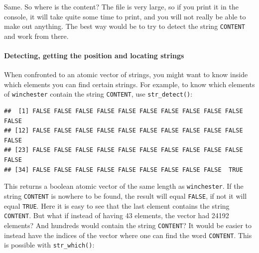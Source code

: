 \documentclass[]{gitbook}
\newenvironment{Shaded}{\begin{snugshade}}{\end{snugshade}}
\newcommand{\KeywordTok}[1]{\textcolor[rgb]{0.13,0.29,0.53}{\textbf{#1}}}
\newcommand{\NormalTok}[1]{#1}
\newcommand{\OperatorTok}[1]{\textcolor[rgb]{0.81,0.36,0.00}{\textbf{#1}}}
\newcommand{\StringTok}[1]{\textcolor[rgb]{0.31,0.60,0.02}{#1}}
\let\oldparagraph\paragraph
\renewcommand{\paragraph}[1]{\oldparagraph{#1}\mbox{}}
\begin{document}
\begin{verbatim}
\end{verbatim}

Same. So where is the content? The file is very large, so if you print it in the console, it will
take quite some time to print, and you will not really be able to make out anything. The best
way would be to try to detect the string \texttt{CONTENT} and work from there.

\hypertarget{detecting-getting-the-position-and-locating-strings}{%
\paragraph{Detecting, getting the position and locating strings}\label{detecting-getting-the-position-and-locating-strings}}

When confronted to an atomic vector of strings, you might want to know inside which elements you
can find certain strings. For example, to know which elements of \texttt{winchester} contain the string
\texttt{CONTENT}, use \texttt{str\_detect()}:

\begin{Shaded}
\end{Shaded}

\begin{verbatim}
##  [1] FALSE FALSE FALSE FALSE FALSE FALSE FALSE FALSE FALSE FALSE FALSE
## [12] FALSE FALSE FALSE FALSE FALSE FALSE FALSE FALSE FALSE FALSE FALSE
## [23] FALSE FALSE FALSE FALSE FALSE FALSE FALSE FALSE FALSE FALSE FALSE
## [34] FALSE FALSE FALSE FALSE FALSE FALSE FALSE FALSE FALSE  TRUE
\end{verbatim}

This returns a boolean atomic vector of the same length as \texttt{winchester}. If the string \texttt{CONTENT} is
nowhere to be found, the result will equal \texttt{FALSE}, if not it will equal \texttt{TRUE}. Here it is easy to
see that the last element contains the string \texttt{CONTENT}. But what if instead of having 43 elements,
the vector had 24192 elements? And hundreds would contain the string \texttt{CONTENT}? It would be easier
to instead have the indices of the vector where one can find the word \texttt{CONTENT}. This is possible
with \texttt{str\_which()}:

\begin{Shaded}
\end{Shaded}
\end{document}
